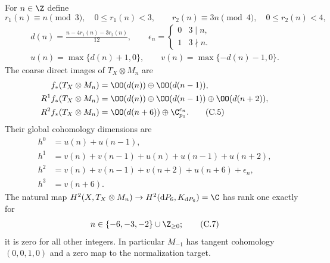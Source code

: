 \begin{proposition}\label{cdp:st:C5b}

For $n\in\Z$ define
\[
 r_1(n)\equiv n\pmod3,\quad 0\le r_1(n)<3,
 \qquad r_2(n)\equiv3n\pmod4,\quad0\le r_2(n)<4,
\]
\begin{gather*}
 d(n)=\frac{n-4r_1(n)-3r_2(n)}{12},\qquad
 \epsilon_n=\begin{cases}0&3\mid n,\\1&3\nmid n.\end{cases}
\\
 u(n)=\max\{d(n)+1,0\},\qquad
 v(n)=\max\{-d(n)-1,0\}.
\end{gather*}
The coarse direct images of $T_X\otimes M_n$ are
\begin{align*}
 f_*(T_X\otimes M_n)&=\OO(d(n))\oplus\OO(d(n-1)),\\
 R^1f_*(T_X\otimes M_n)&=\OO(d(n))\oplus\OO(d(n-1))\oplus\OO(d(n+2)),\\
 R^2f_*(T_X\otimes M_n)&=\OO(d(n+6))\oplus\C_{p_1}^{\epsilon_n}.\tag{C.5}\label{cdp:eq:C.5}
\end{align*}
Their global cohomology dimensions are
\begin{align*}
 h^0&=u(n)+u(n-1),\\
 h^1&=v(n)+v(n-1)+u(n)+u(n-1)+u(n+2),\\
 h^2&=v(n)+v(n-1)+v(n+2)+u(n+6)+\epsilon_n,\\
 h^3&=v(n+6).                                             \tag{C.6}\label{cdp:eq:C.6}
\end{align*}
The natural map $H^2(X,T_X\otimes M_n)\to H^2(\mathrm dP_6,K_{\mathrm dP_6})=\C$ has rank one exactly for
\[
 n\in\{-6,-3,-2\}\cup\Z_{\ge0};                         \tag{C.7}\label{cdp:eq:C.7}
\]
it is zero for all other integers. In particular $M_{-1}$ has tangent cohomology $(0,0,1,0)$ and a zero map to the normalization target.
\end{proposition}

